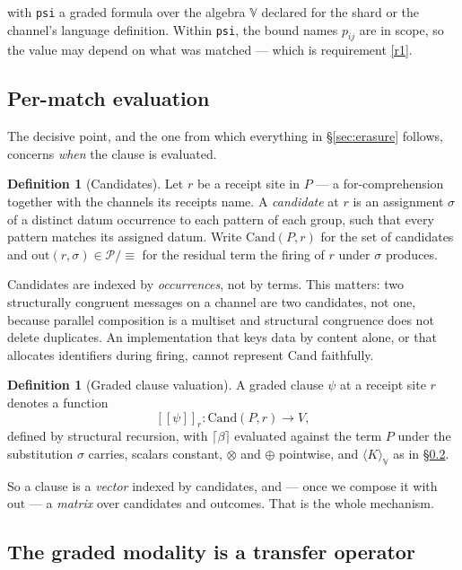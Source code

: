 \documentclass[11pt,a4paper]{article}
\theoremstyle{plain}
\theoremstyle{definition}
\newtheorem{definition}[theorem]{Definition}
\theoremstyle{remark}
\newcommand{\sem}[1]{[\![#1]\!]}
\newcommand{\V}{\mathbb{V}}
\newcommand{\Proc}{\mathcal{P}}
\newcommand{\scong}{\equiv}
\newcommand{\tensorv}{\otimes}
\newcommand{\sumv}{\oplus}
\newcommand{\Cand}{\mathrm{Cand}}
\newcommand{\Out}{\mathrm{out}}
\newcommand{\crisp}[1]{\lceil #1 \rceil}
\begin{document}
\noindent
with \texttt{psi} a graded formula over the algebra $\V$ declared for the shard
or the channel's language definition. Within \texttt{psi}, the bound names
$p_{ij}$ are in scope, so the value may depend on what was matched --- which is
requirement \ref{r1}.

\subsection{Per-match evaluation}\label{ssec:permatch}

The decisive point, and the one from which everything in \S\ref{sec:erasure}
follows, concerns \emph{when} the clause is evaluated.

\begin{definition}[Candidates]\label{def:cand}
Let $r$ be a receipt site in $P$ --- a for-comprehension together with the
channels its receipts name. A \emph{candidate} at $r$ is an assignment $\sigma$
of a distinct datum occurrence to each pattern of each group, such that every
pattern matches its assigned datum. Write $\Cand(P,r)$ for the set of candidates
and $\Out(r,\sigma) \in \Proc/{\scong}$ for the residual term the firing of $r$
under $\sigma$ produces.
\end{definition}

Candidates are indexed by \emph{occurrences}, not by terms. This matters: two
structurally congruent messages on a channel are two candidates, not one,
because parallel composition is a multiset and structural congruence does not
delete duplicates. An implementation that keys data by content alone, or that
allocates identifiers during firing, cannot represent $\Cand$ faithfully.

\begin{definition}[Graded clause valuation]\label{def:val}
A graded clause $\psi$ at a receipt site $r$ denotes a function
\[
  \sem{\psi}_r : \Cand(P,r) \longrightarrow V ,
\]
defined by structural recursion, with $\crisp{\beta}$ evaluated against the term
$P$ under the substitution $\sigma$ carries, scalars constant, $\tensorv$ and
$\sumv$ pointwise, and $\langle K \rangle_\V$ as in \S\ref{ssec:modality}.
\end{definition}

So a clause is a \emph{vector} indexed by candidates, and --- once we compose it
with $\Out$ --- a \emph{matrix} over candidates and outcomes. That is the whole
mechanism.

\subsection{The graded modality is a transfer operator}\label{ssec:modality}
\end{document}
